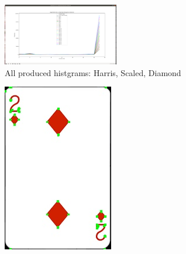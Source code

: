 \documentclass[conference]{IEEEtran}
\begin{document}
\begin{figure}[!htp]
\includegraphics[width=0.45\textwidth]{../programme/results/Task_1/scaled_experiements/Harris/diamond/exp_two_comaring_histograms.png}
\centering
\caption{All produced histgrams: Harris, Scaled, Diamond}
\label{All produced histgrams: Harris, scaled, Diamond}
\end{figure}

\begin{figure}[!htb]
  \centering
  \begin{minipage}[b]{0.2\textwidth}
    \includegraphics[width=\textwidth]{../programme/results/Task_1/scaled_experiements/Harris/diamond/image_0.jpg}

\end{minipage}
\end{figure}
\end{document}

